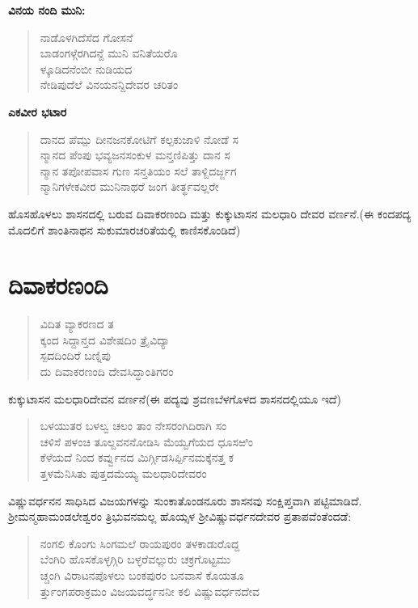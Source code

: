 \textbf{ವಿನಯ ನಂದಿ ಮುನಿ:}

\begin{verse}
 ನಾಡೊಳಗಿದೆಸೆದ ಗೋಸನೆ \\ ಬಾಡಂಗಳ್ಗೆರಗಿದನ್ದೆ ಮುನಿ ವನಿತೆಯರೊ\\ ಳ್ಕೂಡಿದನೆಂಬೀ ನುಡಿಯದ \\ ನೇಡಿಪುದೆಲೆ ವಿನಯನನ್ದಿದೇವರ ಚರಿತಂ
\end{verse}

\textbf{ಎಕವೀರ ಭಟಾರ}

\begin{verse}
 ದಾನದ ಪೆಮ್ಪು ದೀನಜನಕೋಟಿಗೆ ಕಲ್ಪಕುಜಾಳಿ ನೋಡೆ ಸ \\ ನ್ಮಾನದ ಪೆಂಪು ಭವ್ಯಜನಸಂಕುಳ ಮನ್ತಣಿಪಿತ್ತು ದಾನ ಸ \\ ನ್ಮಾನ ತಪೋಪವಾಸ ಗುಣ ಸನ್ತತಿಯಂ ಸಲೆ ತಾಳ್ದಿದರ್ಜ್ಜಗ \\ ನ್ಮಾನಿಗಳೇಕವೀರ ಮುನಿನಾಥರೆ ಜಂಗ ತೀರ್ತ್ಥವಲ್ಲರೇ
\end{verse}

ಹೊಸಹೊಳಲು ಶಾಸನದಲ್ಲಿ ಬರುವ ದಿವಾಕರಣಂದಿ ಮತ್ತು ಕುಕ್ಕುಟಾಸನ ಮಲಧಾರಿ ದೇವರ ವರ್ಣನೆ.\break (ಈ ಕಂದಪದ್ಯ ಮೊದಲಿಗೆ ಶಾಂತಿನಾಥನ ಸುಕುಮಾರಚರಿತೆಯಲ್ಲಿ ಕಾಣಿಸಕೊಂಡಿದೆ)


\section{ದಿವಾಕರಣಂದಿ}

\begin{verse}
 ವಿದಿತ ವ್ಯಾಕರಣದ ತ \\ ಕ್ಕಂದ ಸಿದ್ದಾನ್ತದ ವಿಶೇಷದಿಂ ತ್ರೈವಿದ್ಯಾ \\ ಸ್ಪದದಿಂದಿರೆ ಬಣ್ನಿಪು \\ ದು ದಿವಾಕರಣಂದಿ ದೇವಸಿದ್ಧಾಂತಿಗರಂ
\end{verse}

ಕುಕ್ಕುಟಾಸನ ಮಲಧಾರಿದೇವನ ವರ್ಣನೆ(ಈ ಪದ್ಯವು ಶ್ರವಣಬೆಳಗೊಳದ ಶಾಸನದಲ್ಲಿಯೂ ಇದೆ)

\begin{verse}
ಬಳಯುತರ ಬಳಲ್ವ ಚಲಂ ತಾಂ ನೇಸರಂಗಿದಿರಾಗಿ ಸಂ \\ ಚಳಿಸೆ ಪಳಂಚಿ ತೂಲ್ದವನನೋಡಿಸಿ ಮೆಯ್ವಗೆಯದ ಧೂಸಱಿಂ \\ ಕೆಳೆಯದೆ ನಿಂದ ಕರ್ವ್ವುನದ ಮಿರ್ಗ್ಗಿಡಸಿರ್ಪ್ಪಿನಮಕ್ಕೆನತ್ತ ಕ \\ ತ್ತಳಮೆನಿಸಿತು ಪುತ್ತದಮೆಯ್ಯ ಮಲಧಾರಿದೇವರಂ
\end{verse}

ವಿಷ್ಣುವರ್ಧನನ ಸಾಧಿಸಿದ ವಿಜಯಗಳನ್ನು ಸುಂಕಾತೊಂಡನೂರು ಶಾಸನವು ಸಂಕ್ಷಿಪ್ತವಾಗಿ ಪಟ್ಟಿಮಾಡಿದೆ. ಶ‍್ರೀಮನ್ಮಹಾಮಂಡಲೇಶ್ವರಂ ತ್ರಿಭುವನಮಲ್ಲ ಹೊಯ್ಸಳ ಶ‍್ರೀವಿಷ್ಣುವರ್ಧನದೇವರ ಪ್ರತಾಪವೆಂತೆಂದಡೆ:

\begin{verse}
ನಂಗಲಿ ಕೊಂಗು ಸಿಂಗಮಲೆ ರಾಯಪುರಂ ತಳಕಾಡುರೊದ್ದ \\ ಬೆಂಗಿರಿ ಹೊಸಕೊಳ್ಳಗ್ಗಿರಿ ಬಳ್ಳರೆವಲ್ಲುರು ಚಕ್ರಗೊಟ್ಟಮು \\ ಚ್ಚಂಗಿ ವಿರಾಟನಪೊಳಲು ಬಂಕಪುರಂ ಬನವಾಸೆ ಕೊಯತೂ \\ರ್ತ್ತುಂಗಪರಾಕ್ರಮಂ ವಿಜಯವರ್ದ್ಧನನೀ ಕಲಿ ವಿಷ್ಣುವರ್ಧನದೇವ
\end{verse}

